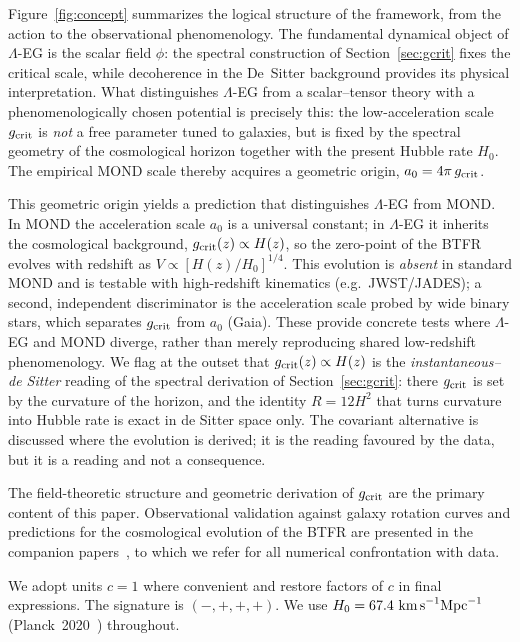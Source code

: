 \documentclass[11pt,a4paper]{article}
\begin{document}
Figure~\ref{fig:concept} summarizes the logical structure of the framework, from the
action to the observational phenomenology. The fundamental dynamical object of
$\Lambda$-EG is the scalar field $\phi$: the spectral construction of
Section~\ref{sec:gcrit} fixes the critical scale, while decoherence in the
De~Sitter background provides its physical interpretation. What distinguishes $\Lambda$-EG
from a scalar--tensor theory with a phenomenologically chosen potential is precisely this:
the low-acceleration scale $g_{\rm crit}$ is \emph{not} a free parameter tuned to galaxies,
but is fixed by the spectral geometry of the cosmological horizon together with the present
Hubble rate $H_0$. The empirical MOND scale thereby acquires a geometric origin,
$a_0 = 4\pi\,g_{\rm crit}$.

This geometric origin yields a prediction that distinguishes $\Lambda$-EG from MOND. In MOND
the acceleration scale $a_0$ is a universal constant; in $\Lambda$-EG it inherits the
cosmological background, $g_{\rm crit}(z)\propto H(z)$, so the zero-point of the BTFR evolves
with redshift as $V\propto[H(z)/H_0]^{1/4}$. This evolution is \emph{absent} in standard MOND
and is testable with high-redshift kinematics (e.g.\ JWST/JADES); a second, independent
discriminator is the acceleration scale probed by wide binary stars, which separates
$g_{\rm crit}$ from $a_0$ (Gaia). These provide concrete tests where $\Lambda$-EG and MOND
diverge, rather than merely reproducing shared low-redshift phenomenology. We
flag at the outset that $g_{\rm crit}(z)\propto H(z)$ is the
\emph{instantaneous--de Sitter} reading of the spectral derivation of
Section~\ref{sec:gcrit}: there $g_{\rm crit}$ is set by the curvature of the
horizon, and the identity $R=12H^2$ that turns curvature into Hubble rate is
exact in de Sitter space only. The covariant alternative is discussed where
the evolution is derived; it is the reading favoured by the data, but it is a
reading and not a consequence.

The field-theoretic structure and geometric derivation of $g_{\rm crit}$ are the primary
content of this paper. Observational validation against galaxy rotation curves and
predictions for the cosmological evolution of the BTFR are presented in the companion
papers~\cite{PaperI,PaperII}, to which we refer for all numerical confrontation with data.

We adopt units $c = 1$ where convenient and restore factors of $c$ in final expressions.
The signature is $(-,+,+,+)$. We use $H_0 = 67.4\ \text{km\,s}^{-1}\text{Mpc}^{-1}$
(Planck~2020~\cite{Planck2020}) throughout.
\end{document}
